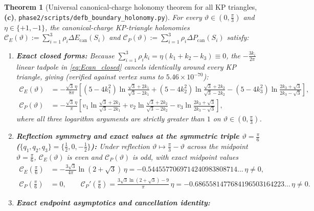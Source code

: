 \documentclass[11pt,a4paper]{article}
\newtheorem{theorem}{Theorem}[section]
\theoremstyle{remark}
\newcommand{\Lc}{\textbf{(c)}}
\newcommand{\shol}{\texttt{phase2/\allowbreak scripts/\allowbreak defb\_\allowbreak boundary\_\allowbreak holonomy.py}}
\begin{document}
\begin{theorem}[Universal canonical-charge holonomy theorem for all KP triangles, \Lc, \shol]\label{thm:universal_holonomy}
For every $\vartheta \in (0,\frac{\pi}{3})$ and $\eta \in \{+1,-1\}$, the
canonical-charge KP-triangle holonomies
$\mathcal{C}_E(\vartheta) := \sum_{i=1}^3 \rho_i\Delta E_{\mathrm{can}}(S_i)$
and $\mathcal{C}_P(\vartheta) := \sum_{i=1}^3 \rho_i\Delta P_{\mathrm{can}}(S_i)$
satisfy:
\begin{enumerate}
\item \textbf{Exact closed forms:}
Because $\sum_{i=1}^3 \rho_i k_i = \eta(k_1 + k_2 - k_3) \equiv 0$, the
$-\frac{3k_i}{2\pi}$ linear tadpole in \eqref{eq:Ecan_closed} cancels
identically around every KP triangle, giving (verified against vertex sums to
$5.46\times 10^{-70}$):
\begin{align}
  \mathcal{C}_E(\vartheta)
  &= -\frac{\sqrt{3}\,\eta}{8\pi}\!\left[
     (5 - 4k_1^2)\ln\frac{\sqrt{3}+2k_1}{\sqrt{3}-2k_1}
     + (5 - 4k_2^2)\ln\frac{\sqrt{3}+2k_2}{\sqrt{3}-2k_2}
     - (5 - 4k_3^2)\ln\frac{2k_3+\sqrt{3}}{2k_3-\sqrt{3}}
     \right], \label{eq:CE_universal}\\
  \mathcal{C}_P(\vartheta)
  &= -\frac{\sqrt{3}\,\eta}{\pi}\!\left[
     v_1\ln\frac{\sqrt{3}+2k_1}{\sqrt{3}-2k_1}
     + v_2\ln\frac{\sqrt{3}+2k_2}{\sqrt{3}-2k_2}
     - v_3\ln\frac{2k_3+\sqrt{3}}{2k_3-\sqrt{3}}
     \right], \label{eq:CP_universal}
\end{align}
where all three logarithm arguments are strictly greater than $1$ on
$\vartheta \in (0,\frac{\pi}{3})$.
\item \textbf{Reflection symmetry and exact values at the symmetric triple
$\vartheta = \frac{\pi}{6}$ ($\{q_1,q_2,q_3\} = \{\frac{1}{2},0,-\frac{1}{2}\}$):}
Under reflection $\vartheta \mapsto \frac{\pi}{3} - \vartheta$ across the
midpoint $\vartheta = \frac{\pi}{6}$, $\mathcal{C}_E(\vartheta)$ is \emph{even}
and $\mathcal{C}_P(\vartheta)$ is \emph{odd}, with exact midpoint values
\begin{align}
  \mathcal{C}_E\!\left(\frac{\pi}{6}\right)
  &= -\frac{3\sqrt{3}}{4\pi}\ln(2+\sqrt{3})\,\eta
  = -0.5445577069714240983808714\ldots\,\eta \ne 0, \label{eq:CE_sym}\\
  \mathcal{C}_P\!\left(\frac{\pi}{6}\right) &= 0, \qquad
  \mathcal{C}_P'\!\left(\frac{\pi}{6}\right)
  = \frac{3\sqrt{3}\ln(2+\sqrt{3}) - 9}{\pi}\,\eta
  = -0.6865581477684196503164223\ldots\,\eta \ne 0. \label{eq:CP_sym}
\end{align}
\item \textbf{Exact endpoint asymptotics and cancellation identity:}

\end{enumerate}
\end{theorem}
\end{document}
